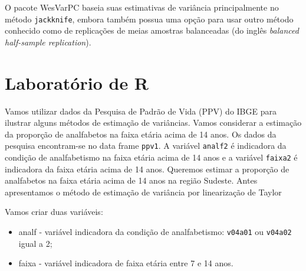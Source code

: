 \documentclass[]{book}
\providecommand{\tightlist}{%
  \setlength{\itemsep}{0pt}\setlength{\parskip}{0pt}}
\theoremstyle{definition}
\theoremstyle{definition}
\theoremstyle{definition}
\theoremstyle{remark}
\begin{document}
O pacote WesVarPC \citep{Westat} baseia suas estimativas de variância
principalmente no método \texttt{jackknife}, embora também possua uma
opção para usar outro método conhecido como de replicações de meias
amostras balanceadas (do inglês \emph{balanced half-sample
replication}).

\section{Laboratório de R}\label{laboratorio-de-r}

Vamos utilizar dados da Pesquisa de Padrão de Vida (PPV) do IBGE para
ilustrar alguns métodos de estimação de variâncias. Vamos considerar a
estimação da proporção de analfabetos na faixa etária acima de 14 anos.
Os dados da pesquisa encontram-se no data frame \texttt{ppv1}. A
variável \texttt{analf2} é indicadora da condição de analfabetismo na
faixa etária acima de 14 anos e a variável \texttt{faixa2} é indicadora
da faixa etária acima de 14 anos. Queremos estimar a proporção de
analfabetos na faixa etária acima de 14 anos na região Sudeste. Antes
apresentamos o método de estimação de variância por linearização de
Taylor

Vamos criar duas variáveis:

\begin{itemize}
\tightlist
\item
  analf - variável indicadora da condição de analfabetismo:
  \texttt{v04a01} ou \texttt{v04a02} igual a 2;
\item
  faixa - variável indicadora de faixa etária entre 7 e 14 anos.
\end{itemize}
\end{document}
